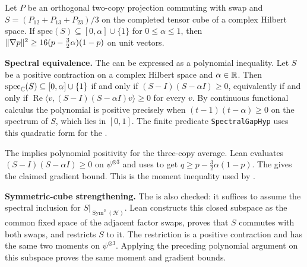 \begin{lemma}\label{lem:bound-gradient}
  \leanok
  \par
  Let $P$ be an orthogonal two-copy projection commuting with swap and
  $S=(P_{12}+P_{13}+P_{23})/3$ on the completed tensor cube of a complex
  Hilbert space. If $\mathrm{spec}(S)\subseteq[0,\alpha]\cup\{1\}$ for
  $0\le\alpha\le1$, then
  $\lVert \nabla p \rVert^2\ge16(p-\tfrac32\alpha)(1-p)$ on unit vectors.

  \textbf{Spectral equivalence.}
  The  can be expressed as a
  polynomial inequality. Let $S$ be a positive contraction on a complex Hilbert space and $\alpha\in\mathbb{R}$.
  Then $\mathrm{spec}_{\mathbb{C}}(S)\subseteq [0,\alpha]\cup\{1\}$ if and only if
  $(S-I)(S-\alpha I)\ge0$, equivalently if and only if
  $\operatorname{Re}\langle v,(S-I)(S-\alpha I)v\rangle\ge0$ for every $v$.
  By continuous functional calculus the polynomial is positive precisely when
  $(t-1)(t-\alpha)\ge0$ on the spectrum of $S$, which lies in $[0,1]$.
  The finite predicate \texttt{SpectralGapHyp} uses this quadratic form for the
  .

  The  implies
  polynomial positivity for the three-copy average. Lean evaluates
  $(S-I)(S-\alpha I)\ge0$ on $\psi^{\otimes3}$ and uses
   to get $q\ge p-\tfrac32\alpha(1-p)$.
  The  gives the
  claimed gradient bound.
  This is the moment inequality used by .

  \textbf{Symmetric-cube strengthening.}
  The 
  is also checked: it suffices to assume the spectral inclusion for
  $S|_{\operatorname{Sym}^3(\mathcal H)}$.
  Lean constructs this closed subspace as the common fixed space of the
  adjacent factor swaps, proves that $S$ commutes with both swaps, and
  restricts $S$ to it. The restriction is a positive contraction and has the
  same two moments on $\psi^{\otimes3}$. Applying the preceding polynomial
  argument on this subspace proves the same moment and gradient bounds.
\end{lemma}

